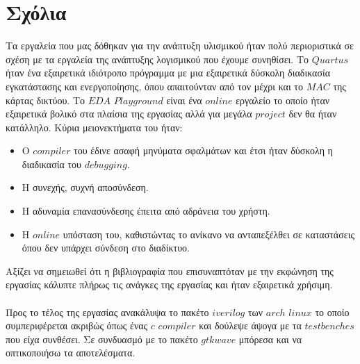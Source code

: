 \documentclass{report}
\begin{document}
\section*{Σχόλια}
Τα εργαλεία που μας δόθηκαν για την ανάπτυξη υλισμικού ήταν πολύ περιοριστικά σε 
σχέση με τα εργαλεία της ανάπτυξης λογισμικού που έχουμε συνηθίσει. Το $Quartus$ ήταν ένα 
εξαιρετικά ιδιότροπο πρόγραμμα με μια εξαιρετικά δύσκολη διαδικασία εγκατάστασης και ενεργοποίησης, 
όπου απαιτούνταν από τον μέχρι και το $MAC$ της κάρτας δικτύου. Το $EDA$ $Playground$ είναι ένα $online$ 
εργαλείο το οποίο ήταν εξαιρετικά βολικό στα πλαίσια της εργασίας αλλά για μεγάλα $project$ δεν θα ήταν 
κατάλληλο. Κύρια μειονεκτήματα του ήταν:
\begin{itemize}
    \item Ο $compiler$ του έδινε ασαφή μηνύματα σφαλμάτων και έτσι ήταν δύσκολη η διαδικασία του $debugging$.
    \item Η συνεχής, συχνή αποσύνδεση.
    \item Η αδυναμία επανασύνδεσης έπειτα από αδράνεια του χρήστη.
    \item Η $online$ υπόσταση του, καθιστώντας το ανίκανο να ανταπεξέλθει σε καταστάσεις όπου δεν υπάρχει
    σύνδεση στο διαδίκτυο.
\end{itemize}
Αξίζει να σημειωθεί ότι η βιβλιογραφία που επισυναπτόταν με την εκφώνηση της εργασίας κάλυπτε πλήρως 
τις ανάγκες της εργασίας και ήταν εξαιρετικά χρήσιμη.
\\
\smallskip
\\
Προς το τέλος της εργασίας ανακάλυψα το πακέτο $iverilog$ των $arch$ $linux$ το οποίο συμπεριφέρεται 
ακριβώς όπως ένας $c$ $compiler$ και δούλεψε άψογα με τα $testbenches$ που είχα συνθέσει. Σε συνδυασμό 
με το πακέτο $gtkwave$ μπόρεσα και να οπτικοποιήσω τα αποτελέσματα.
\\
\smallskip
\\
\end{document}
